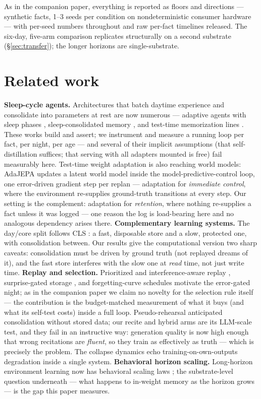\documentclass[11pt]{article}
\begin{document}
As in the companion paper, everything is reported as floors and directions --- synthetic facts,
1--3 seeds per condition on nondeterministic consumer hardware --- with per-seed numbers throughout
and raw per-fact timelines released. The six-day, five-arm comparison replicates structurally on a
second substrate (\S\ref{sec:transfer}); the longer horizons are single-substrate.

\section{Related work}\label{sec:related}

\textbf{Sleep-cycle agents.} Architectures that batch daytime experience and consolidate into
parameters at rest are now numerous --- adaptive agents with sleep phases
\citep{letThemSleep2026}, sleep-consolidated memory \citep{scm2026}, and test-time memorization
lines \citep{behrouz2024titans}. These works build and assert; we instrument and measure a running
loop per fact, per night, per age --- and several of their implicit assumptions (that self-distillation
suffices; that serving with all adapters mounted is free) fail measurably here. Test-time weight adaptation is also reaching world models: AdaJEPA
\citep{wang2026adajepa} updates a latent world model inside the model-predictive-control loop, one
error-driven gradient step per replan --- adaptation for \emph{immediate control}, where the
environment re-supplies ground-truth transitions at every step. Our setting is the complement:
adaptation for \emph{retention}, where nothing re-supplies a fact unless it was logged --- one
reason the log is load-bearing here and no analogous dependency arises there.
\textbf{Complementary learning systems.} The day/core split follows CLS \citep{mcclelland1995}:
a fast, disposable store and a slow, protected one, with consolidation between. Our results give the
computational version two sharp caveats: consolidation must be driven by ground truth (not replayed
dreams of it), and the fast store interferes with the slow one at \emph{read} time, not just write
time. \textbf{Replay and selection.} Prioritized and interference-aware replay
\citep{schaul2015,aljundi2019mir}, surprise-gated storage \citep{sure2025}, and forgetting-curve
schedules \citep{mssr2026} motivate the error-gated night; as in the companion paper we claim no
novelty for the selection rule itself --- the contribution is the budget-matched measurement of what
it buys (and what its self-test costs) inside a full loop. Pseudo-rehearsal \citep{robins1995}
anticipated consolidation without stored data; our recite and hybrid arms are its LLM-scale test,
and they fail in an instructive way: generation quality is now high enough that wrong recitations
are \emph{fluent}, so they train as effectively as truth --- which is precisely the problem. The
collapse dynamics echo training-on-own-outputs degradation \citep{shumailov2024} inside a single
system. \textbf{Behavioral horizon scaling.} Long-horizon environment learning now has behavioral
scaling laws \citep{edgebench2026}; the substrate-level question underneath --- what happens to
in-weight memory as the horizon grows --- is the gap this paper measures.
\end{document}

